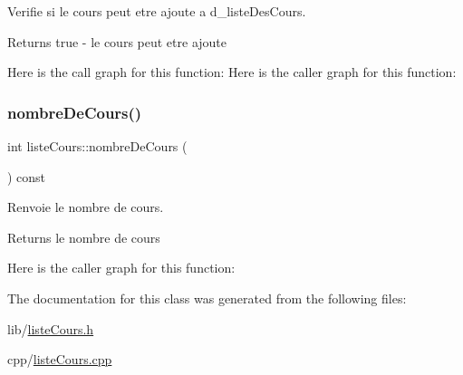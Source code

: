 Verifie si le cours peut etre ajoute a d\+\_\+liste\+Des\+Cours. 

\begin{DoxyReturn}{Returns}
true -\/ le cours peut etre ajoute 
\end{DoxyReturn}
Here is the call graph for this function\+:
Here is the caller graph for this function\+:
\hypertarget{classliste_cours_a34b859c2380770eb560c0a6dcf01cc81}{}\label{classliste_cours_a34b859c2380770eb560c0a6dcf01cc81} 
\subsubsection{\texorpdfstring{nombre\+De\+Cours()}{nombreDeCours()}}
{\footnotesize\ttfamily int liste\+Cours\+::nombre\+De\+Cours (\begin{DoxyParamCaption}{ }\end{DoxyParamCaption}) const}



Renvoie le nombre de cours. 

\begin{DoxyReturn}{Returns}
le nombre de cours 
\end{DoxyReturn}
Here is the caller graph for this function\+:


The documentation for this class was generated from the following files\+:\begin{DoxyCompactItemize}
\item 
lib/\hyperlink{liste_cours_8h}{liste\+Cours.\+h}\item 
cpp/\hyperlink{liste_cours_8cpp}{liste\+Cours.\+cpp}\end{DoxyCompactItemize}
